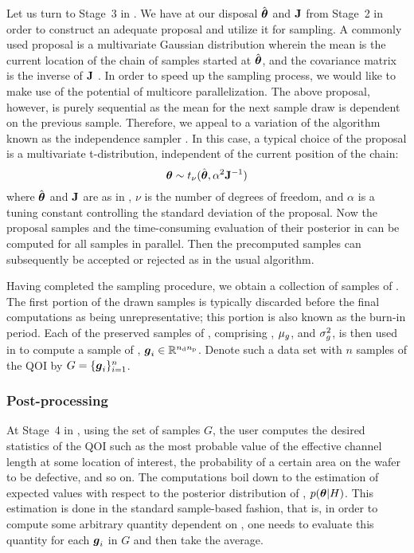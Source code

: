 Let us turn to Stage~3 in . We have at our disposal $\hat{\boldsymbol{\theta}}$
and $\mathbf{J}$ from Stage~2 in order to construct an adequate proposal and utilize
it for sampling. A commonly used proposal is a multivariate Gaussian
distribution wherein the mean is the current location of the chain of samples
started at $\hat{\boldsymbol{\theta}}$, and the covariance matrix is the inverse of $\mathbf{J}$
\cite{gelman2004}. In order to speed up the sampling process, we would like to
make use of the potential of multicore parallelization. The above proposal,
however, is purely sequential as the mean for the next sample draw is dependent
on the previous sample. Therefore, we appeal to a variation of the 
algorithm known as the independence sampler \cite{gelman2004}. In this case, a
typical choice of the proposal is a multivariate t-distribution, independent of
the current position of the chain:
\begin{equation} \elab{proposal}
  \vt \sim t_\nu(\hat{\vt}, \alpha^2 \m{J}^{-1})
\end{equation}
where $\hat{\boldsymbol{\theta}}$ and $\mathbf{J}$ are as in , $\nu$ is the number
of degrees of freedom, and $\alpha$ is a tuning constant controlling the
standard deviation of the proposal. Now the proposal samples and the
time-consuming evaluation of their posterior in  can be computed
for all samples in parallel. Then the precomputed samples can subsequently be
accepted or rejected as in the usual  algorithm.

Having completed the sampling procedure, we obtain a collection of samples of
\vt. The first portion of the drawn samples is typically discarded before the
final computations as being unrepresentative; this portion is also known as the
burn-in period. Each of the preserved samples of \vt, comprising \vz, $\mu_g$,
and $\sigma^2_g$, is then used in  to compute a sample
of \g, $\boldsymbol{g}_i \in \mathbb{R}^{{n_\mathrm{d}} {n_\mathrm{p}}}$. Denote such a data set with $n$ samples of
the \ac{QOI} by $G = \{ \boldsymbol{g}_i \}_{i = 1}^n$.

\subsubsection{Post-processing}

At Stage~4 in , using the set of samples $G$, the user computes
the desired statistics of the \ac{QOI} such as the most probable value of the
effective channel length at some location of interest, the probability of a
certain area on the wafer to be defective, and so on. The computations boil down
to the estimation of expected values with respect to the posterior distribution
of \vt, $p(\boldsymbol{\theta} | H)$. This estimation is done in the standard sample-based
fashion, that is, in order to compute some arbitrary quantity dependent on \g,
one needs to evaluate this quantity for each $\boldsymbol{g}_i$ in $G$ and then take the
average.

